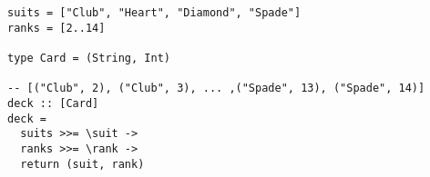 \begin{algorithm}

\begin{verbatim}
suits = ["Club", "Heart", "Diamond", "Spade"]
ranks = [2..14]

type Card = (String, Int)

-- [("Club", 2), ("Club", 3), ... ,("Spade", 13), ("Spade", 14)]
deck :: [Card]
deck =
  suits >>= \suit ->
  ranks >>= \rank ->
  return (suit, rank)
\end{verbatim}

\caption{Monadic bind in list monad results in a cartesian product %
\label{monad:bind}}
\end{algorithm}